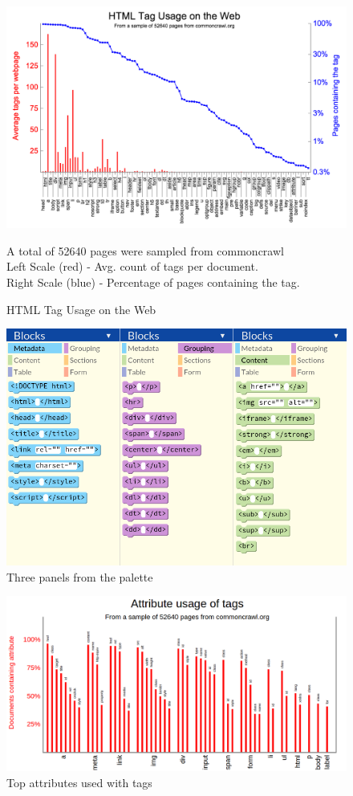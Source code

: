 \documentclass[conference]{IEEEtran}
\begin{document}
\begin{figure}
\centering
\includegraphics[width=\columnwidth]{taggraph3.png}
\caption{HTML Tag Usage on the Web}
\small
\begin{flushleft}
A total of 52640 pages were sampled from commoncrawl \cite{commoncrawl}\\
Left Scale (red) - Avg. count of tags per document.\\
Right Scale (blue) - Percentage of pages containing the tag.
\end{flushleft}
\label{Tagsgraph}
\end{figure}

\begin{figure}
\centering
\includegraphics[width=0.7\columnwidth]{Palette.png}
\caption{Three panels from the palette}
\label{paletteimage}
\end{figure}

\begin{figure}
\centering
\includegraphics[width=\columnwidth]{attrgraph.png}
\caption{Top attributes used with tags}
\label{attrgraph}
\end{figure}
\end{document}
